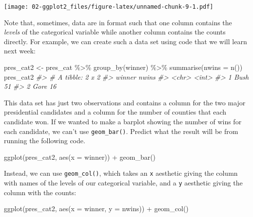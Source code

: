 \documentclass[
]{book}
\newenvironment{Shaded}{\begin{snugshade}}{\end{snugshade}}
\newcommand{\AttributeTok}[1]{\textcolor[rgb]{0.77,0.63,0.00}{#1}}
\newcommand{\CommentTok}[1]{\textcolor[rgb]{0.56,0.35,0.01}{\textit{#1}}}
\newcommand{\FunctionTok}[1]{\textcolor[rgb]{0.00,0.00,0.00}{#1}}
\newcommand{\NormalTok}[1]{#1}
\newcommand{\OtherTok}[1]{\textcolor[rgb]{0.56,0.35,0.01}{#1}}
\newcommand{\SpecialCharTok}[1]{\textcolor[rgb]{0.00,0.00,0.00}{#1}}
\begin{document}
\texttt{[image: 02-ggplot2\_files/figure-latex/unnamed-chunk-9-1.pdf]}

Note that, sometimes, data are in format such that one column contains the \emph{levels} of the categorical variable while another column contains the counts directly. For example, we can create such a data set using code that we will learn next week:

\begin{Shaded}
\begin{Highlighting}[]
\NormalTok{pres\_cat2 }\OtherTok{\textless{}{-}}\NormalTok{ pres\_cat }\SpecialCharTok{\%\textgreater{}\%} \FunctionTok{group\_by}\NormalTok{(winner) }\SpecialCharTok{\%\textgreater{}\%}
  \FunctionTok{summarise}\NormalTok{(}\AttributeTok{nwins =} \FunctionTok{n}\NormalTok{())}
\NormalTok{pres\_cat2}
\CommentTok{\#\textgreater{} \# A tibble: 2 x 2}
\CommentTok{\#\textgreater{}   winner nwins}
\CommentTok{\#\textgreater{}   \textless{}chr\textgreater{}  \textless{}int\textgreater{}}
\CommentTok{\#\textgreater{} 1 Bush      51}
\CommentTok{\#\textgreater{} 2 Gore      16}
\end{Highlighting}
\end{Shaded}

This data set has just two observations and contains a column for the two major presidential candidates and a column for the number of counties that each candidate won. If we wanted to make a barplot showing the number of wins for each candidate, we can't use \texttt{geom\_bar()}. Predict what the result will be from running the following code.

\begin{Shaded}
\begin{Highlighting}[]
\FunctionTok{ggplot}\NormalTok{(pres\_cat2, }\FunctionTok{aes}\NormalTok{(}\AttributeTok{x =}\NormalTok{ winner)) }\SpecialCharTok{+}
  \FunctionTok{geom\_bar}\NormalTok{()}
\end{Highlighting}
\end{Shaded}

Instead, we can use \texttt{geom\_col()}, which takes an \texttt{x} aesthetic giving the column with names of the levels of our categorical variable, and a \texttt{y} aesthetic giving the column with the counts:

\begin{Shaded}
\begin{Highlighting}[]
\FunctionTok{ggplot}\NormalTok{(pres\_cat2, }\FunctionTok{aes}\NormalTok{(}\AttributeTok{x =}\NormalTok{ winner, }\AttributeTok{y =}\NormalTok{ nwins)) }\SpecialCharTok{+}
  \FunctionTok{geom\_col}\NormalTok{()}
\end{Highlighting}
\end{Shaded}
\end{document}
